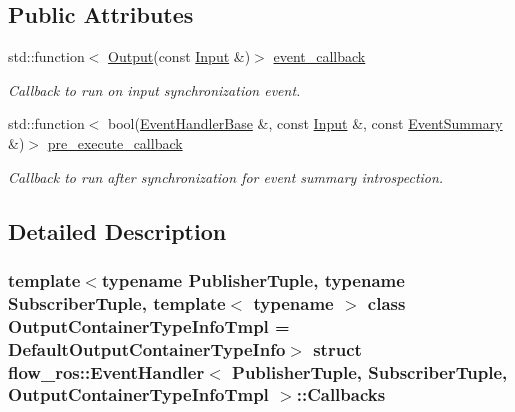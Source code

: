 \subsection*{Public Attributes}
\begin{DoxyCompactItemize}
\item 
\mbox{\label{structflow__ros_1_1_event_handler_1_1_callbacks_a59bb4b497f7f3b8daff5822cc41ea551}} 
std\+::function$<$ \hyperlink{classflow__ros_1_1_event_handler_ae5dc263e5c12a4b7fb60f320dc403173}{Output}(const \hyperlink{classflow__ros_1_1_event_handler_a53af7756aaf98646281d57b036510d56}{Input} \&)$>$ \hyperlink{structflow__ros_1_1_event_handler_1_1_callbacks_a59bb4b497f7f3b8daff5822cc41ea551}{event\+\_\+callback}
\begin{DoxyCompactList}\small\item\em Callback to run on input synchronization event. \end{DoxyCompactList}\item 
std\+::function$<$ bool(\hyperlink{classflow__ros_1_1_event_handler_base}{Event\+Handler\+Base} \&, const \hyperlink{classflow__ros_1_1_event_handler_a53af7756aaf98646281d57b036510d56}{Input} \&, const \hyperlink{structflow__ros_1_1_event_summary}{Event\+Summary} \&)$>$ \hyperlink{structflow__ros_1_1_event_handler_1_1_callbacks_ac2f9171575dff2a7adc0d5e4efa38849}{pre\+\_\+execute\+\_\+callback}
\begin{DoxyCompactList}\small\item\em Callback to run after synchronization for event summary introspection. \end{DoxyCompactList}\end{DoxyCompactItemize}


\subsection{Detailed Description}
\subsubsection*{template$<$typename Publisher\+Tuple, typename Subscriber\+Tuple, template$<$ typename $>$ class Output\+Container\+Type\+Info\+Tmpl = Default\+Output\+Container\+Type\+Info$>$\newline
struct flow\+\_\+ros\+::\+Event\+Handler$<$ Publisher\+Tuple, Subscriber\+Tuple, Output\+Container\+Type\+Info\+Tmpl $>$\+::\+Callbacks}

